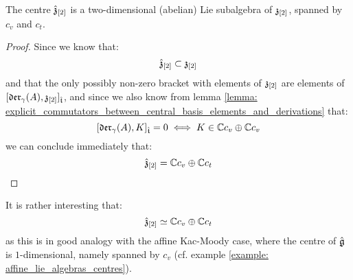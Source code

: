         \begin{proposition} \label{prop: centres_of_yangian_extended_toroidal_lie_algebras}
            The centre $\hat{\mathfrak{z}}_{[2]}$ is a two-dimensional (abelian) Lie subalgebra of $\mathfrak{z}_{[2]}$, spanned by $c_v$ and $c_t$. 
        \end{proposition}
            \begin{proof}
                Since we know that:
                    $$\hat{\mathfrak{z}}_{[2]} \subset \mathfrak{z}_{[2]}$$
                and that the only possibly non-zero bracket with elements of $\mathfrak{z}_{[2]}$ are elements of $[\mathfrak{der}_{\gamma}(A), \mathfrak{z}_{[2]}]_{\hat{\mathfrak{t}}}$, and since we also know from lemma \ref{lemma: explicit_commutators_between_central_basis_elements_and_derivations} that:
                    $$[\mathfrak{der}_{\gamma}(A), K]_{\hat{\mathfrak{t}}} = 0 \iff K \in \mathbb{C} c_v \oplus \mathbb{C} c_v$$
                we can conclude immediately that:
                    $$\hat{\mathfrak{z}}_{[2]} = \mathbb{C} c_v \oplus \mathbb{C} c_t$$
            \end{proof}
        \begin{remark}
            It is rather interesting that:
                $$\hat{\mathfrak{z}}_{[2]} \simeq \mathbb{C} c_v \oplus \mathbb{C} c_t$$
            as this is in good analogy with the affine Kac-Moody case, where the centre of $\hat{\mathfrak{g}}$ is $1$-dimensional, namely spanned by $c_v$ (cf. example \ref{example: affine_lie_algebras_centres}).
        \end{remark}